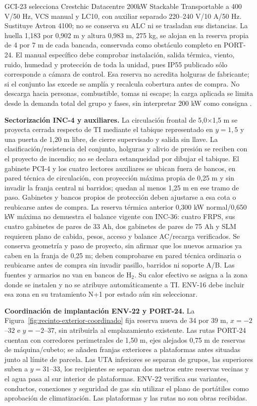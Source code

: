GCI-23 selecciona Crestchic Datacentre 200kW Stackable Transportable a 400 V/50 Hz, VCS manual y LC10, con auxiliar separado 220--240 V/10 A/50 Hz. Sustituye Avtron 4100; no se conserva su ALC ni se trasladan sus distancias. La huella 1,183 por 0,902 m y altura 0,983 m, 275 kg, se alojan en la reserva propia de 4 por 7 m de cada bancada, conservada como obstáculo completo en PORT-24. El manual específico debe comprobar instalación, salida térmica, viento, ruido, humedad y protección de toda la unidad, pues IP55 publicado sólo corresponde a cámara de control. Esa reserva no acredita holguras de fabricante; si el conjunto las excede se amplía y recalcula cobertura antes de compra. No descarga hacia personas, combustible, tomas ni escape; la carga aplicada se limita desde la demanda total del grupo y fases, sin interpretar 200 kW como consigna \parencite[pp.~1--2]{lote23-crest200}.

\textbf{Sectorización INC-4 y auxiliares.} La circulación frontal de 5,0$\times$1,5 m se proyecta cerrada respecto de TI mediante el tabique representado en $y=1,5$ y una puerta de 1,20 m libre, de cierre supervisado y salida sin llave. La clasificación/resistencia del conjunto, holguras y alivio de presión se reciben con el proyecto de incendio; no se declara estanqueidad por dibujar el tabique. El gabinete PCI-4 y los cuatro lectores auxiliares se ubican fuera de bancos, en pared técnica de circulación, con proyección máxima propia de 0,25 m y sin invadir la franja central ni barridos; quedan al menos 1,25 m en ese tramo de paso. Gabinetes y bancos propios de protección deben ajustarse a esa cota o reubicarse antes de compra. La reserva térmica anterior 0,300 kW normal/0,650 kW máxima no demuestra el balance vigente con INC-36: cuatro FRPS, sus cuatro gabinetes de pares de 33 Ah, dos gabinetes de pares de 75 Ah y SLM requieren plano de cabida, pesos, acceso y balance AC/recarga verificados. Se conserva geometría y paso de proyecto, sin afirmar que los nuevos armarios ya caben en la franja de 0,25 m; deben comprobarse en pared técnica ordinaria o reubicarse antes de compra sin invadir pasillo, barridos ni soporte A/B. Las fuentes y armarios no van en bancos de H$_2$. Su calor efectivo se asigna a la zona donde se instalen y no se atribuye automáticamente a TI. ENV-16 debe incluir esa zona en su tratamiento N+1 por estado aún sin seleccionar.

\textbf{Coordinación de implantación ENV-22 y PORT-24.} La Figura~\ref{fig:recinto-exterior-coordinado} fija reserva nueva de 34 por 39 m, $x=-2$--$32$ e $y=-2$--$37$, sin atribuirla al emplazamiento existente. Las rutas PORT-24 cuentan con corredores perimetrales de 1,50 m, ejes alejados 0,75 m de reservas de máquina/cubeto; se añaden franjas exteriores a plataformas antes situadas junto al límite de parcela. Las UTA inferiores se separan de grupos, las superiores suben a $y=31$--$33$, los recipientes se separan dos metros entre reservas vecinas y el agua pasa al sur interior de plataformas. ENV-22 verifica sus variantes, conductos, conexiones y seguridad de gas sin utilizar el plano de portátiles como aprobación de climatización. Las plataformas y las rutas no son obras recibidas.

